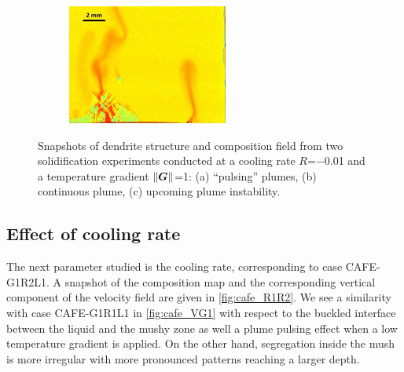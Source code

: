 \begin{figure}[htbp]
\begin{subfigure}{0.3\textwidth}
    \centering
	\includegraphics[width=\textwidth]{Chapter4/Graphics/freckle_exp/exp_instability.png}
	\caption{}
    \label{fig:exp_instability}
  \end{subfigure}
\captionsetup{singlelinecheck=off}
\caption[.]{Snapshots of dendrite structure and composition field from two 
solidification experiments conducted at a cooling rate 
$R$=\SI{-0.01}{\uCR} and a temperature gradient $\lVert \boldsymbol{G} \rVert$=\SI{1}{\ugradT}: (a) “pulsing” plumes, 
(b) continuous plume, (c) upcoming plume instability.} 
\label{fig:experimental_freckles_regimes}
\end{figure}


\subsection{Effect of cooling rate}

The next parameter studied is the cooling rate, corresponding to case CAFE-G1R2L1. A snapshot of the composition map 
and the corresponding vertical component of the velocity field are given in \cref{fig:cafe_R1R2}. We see a similarity 
with case CAFE-G1R1L1 in \cref{fig:cafe_VG1} with respect to the buckled interface between the liquid and the mushy 
zone as well a plume pulsing effect when a low temperature gradient is applied. On the other hand, segregation inside 
the mush is more irregular with more pronounced patterns reaching a larger depth. 

